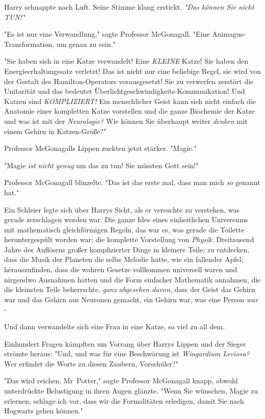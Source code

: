 {Harry schnappte nach Luft. Seine Stimme klang erstickt. \emph{"Das können Sie nicht TUN!"}

"Es ist nur eine Verwandlung," sagte Professor McGonagall. "Eine Animagus-Transformation, um genau zu sein."

"Sie haben sich in eine Katze verwandelt! Eine \emph{KLEINE} Katze! Sie haben den Energieerhaltungssatz verletzt! Das ist nicht nur eine beliebige Regel, sie wird von der Gestalt des Hamilton-Operators vorausgesetzt! Sie zu verwerfen zerstört die Unitarität und das bedeutet Überlichtgeschwindigkeits-Kommunikation! Und Katzen sind \emph{KOMPLIZIERT!} Ein menschlicher Geist kann sich nicht einfach die Anatomie einer kompletten Katze vorstellen und die ganze Biochemie der Katze und was ist mit der \emph{Neurologie?} Wie können Sie überhaupt weiter \emph{denken} mit einem Gehirn in Katzen-Größe?"

Professor McGonagalls Lippen zuckten jetzt stärker. "Magie."

"Magie \emph{ist nicht genug} um das zu tun! Sie müssten Gott sein!"

Professor McGonagall blinzelte. "Das ist das erste mal, dass man mich \emph{so} genannt hat."

Ein Schleier legte sich über Harrys Sicht, als er versuchte zu verstehen, was gerade zerschlagen worden war. Die ganze Idee eines einheitlichen Universums mit mathematisch gleichförmigen Regeln, das war es, was gerade die Toilette heruntergespült worden war; die komplette Vorstellung von \emph{Physik}. Dreitausend Jahre des Auflösens großer komplizierter Dinge in kleinere Teile; zu entdecken, dass die Musik der Planeten die selbe Melodie hatte, wie ein fallender Apfel; herauszufinden, dass die wahren Gesetze vollkommen universell waren und nirgendwo Ausnahmen hatten und die Form einfacher Mathematik annahmen, die die kleinsten Teile beherrschte, \emph{ganz abgesehen davon}, dass der Geist das Gehirn war und das Gehirn aus Neuronen gemacht, ein Gehirn war, was eine Person \emph{war} -

Und dann verwandelte sich eine Frau in eine Katze, so viel zu all dem.

Einhundert Fragen kämpften um Vorrang über Harrys Lippen und der Sieger strömte heraus: "Und, und was für eine Beschwörung ist \emph{Wingardium Leviosa?} Wer erfindet die Worte zu diesen Zaubern, Vorschüler?"

"Das wird reichen, Mr~Potter," sagte Professor McGonagall knapp, obwohl unterdrückte Belustigung in ihren Augen glänzte. "Wenn Sie wünschen, Magie zu erlernen, schlage ich vor, dass wir die Formalitäten erledigen, damit Sie nach Hogwarts gehen können."

}
